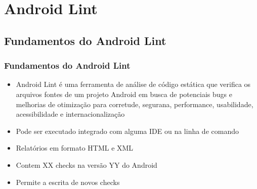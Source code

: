 \documentclass{beamer}
\begin{document}
\section{Android Lint}
    \subsection{Fundamentos do Android Lint}
    \frame
    {
        \frametitle{Fundamentos do Android Lint}
        \begin{itemize}
            \item Android Lint é uma ferramenta de análise de código estática que
            verifica os arquivos fontes de um projeto Android em busca de potenciais
            bugs e melhorias de otimização para corretude, segurana, performance,
            usabilidade, acessibilidade e internacionalização
            \item Pode ser executado integrado com alguma IDE ou na linha de comando
            \item Relatórios em formato HTML e XML
            \item Contem XX checks na versão YY do Android
            \item Permite a escrita de novos checks
        \end{itemize}     
   }
\end{document}
